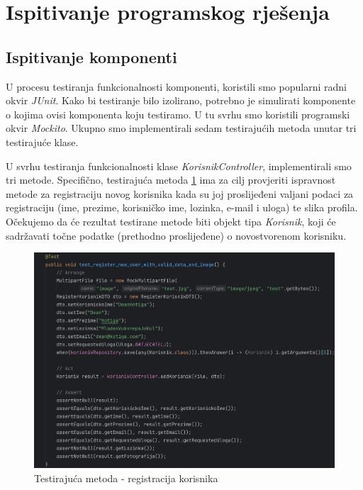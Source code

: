 \eject


\section{Ispitivanje programskog rješenja}




\subsection{Ispitivanje komponenti}
U procesu testiranja funkcionalnosti komponenti,  koristili smo popularni radni okvir \textit{JUnit}. Kako bi testiranje bilo izolirano, potrebno je simulirati komponente o kojima ovisi komponenta koju testiramo. U tu svrhu smo koristili programski okvir \textit{Mockito}. Ukupno smo implementirali sedam testirajućih metoda unutar tri testirajuće klase.

\vspace{1em}

U svrhu testiranja funkcionalnosti klase \textit{KorisnikController}, implementirali smo tri metode. Specifično, testirajuća metoda \ref{fig:test1} ima za cilj provjeriti ispravnost metode za registraciju novog korisnika kada su joj proslijeđeni valjani podaci za registraciju (ime, prezime, korisničko ime, lozinka, e-mail i uloga) te slika profila. Očekujemo da će rezultat testirane metode biti objekt tipa \textit{Korisnik}, koji će sadržavati točne podatke (prethodno proslijeđene) o novostvorenom korisniku.

\begin{figure}[H]
	\includegraphics[scale=0.15]{slike/test1.png}
	\centering
	\caption{Testirajuća metoda - registracija korisnika}
	\label{fig:test1}
\end{figure}

